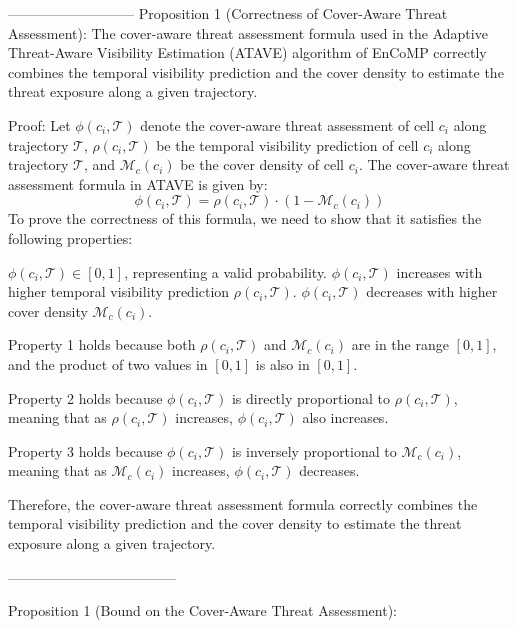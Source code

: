 ---------------------------
Proposition 1 (Correctness of Cover-Aware Threat Assessment):
The cover-aware threat assessment formula used in the Adaptive Threat-Aware Visibility Estimation (ATAVE) algorithm of EnCoMP correctly combines the temporal visibility prediction and the cover density to estimate the threat exposure along a given trajectory.

Proof:
Let $\phi(c_i, \mathcal{T})$ denote the cover-aware threat assessment of cell $c_i$ along trajectory $\mathcal{T}$, $\rho(c_i, \mathcal{T})$ be the temporal visibility prediction of cell $c_i$ along trajectory $\mathcal{T}$, and $\mathcal{M}_c(c_i)$ be the cover density of cell $c_i$.
The cover-aware threat assessment formula in ATAVE is given by:
\begin{equation}
\phi(c_i, \mathcal{T}) = \rho(c_i, \mathcal{T}) \cdot (1 - \mathcal{M}_c(c_i))
\end{equation}
To prove the correctness of this formula, we need to show that it satisfies the following properties:

$\phi(c_i, \mathcal{T}) \in [0, 1]$, representing a valid probability.
$\phi(c_i, \mathcal{T})$ increases with higher temporal visibility prediction $\rho(c_i, \mathcal{T})$.
$\phi(c_i, \mathcal{T})$ decreases with higher cover density $\mathcal{M}_c(c_i)$.

Property 1 holds because both $\rho(c_i, \mathcal{T})$ and $\mathcal{M}_c(c_i)$ are in the range $[0, 1]$, and the product of two values in $[0, 1]$ is also in $[0, 1]$.

Property 2 holds because $\phi(c_i, \mathcal{T})$ is directly proportional to $\rho(c_i, \mathcal{T})$, meaning that as $\rho(c_i, \mathcal{T})$ increases, $\phi(c_i, \mathcal{T})$ also increases.

Property 3 holds because $\phi(c_i, \mathcal{T})$ is inversely proportional to $\mathcal{M}_c(c_i)$, meaning that as $\mathcal{M}_c(c_i)$ increases, $\phi(c_i, \mathcal{T})$ decreases.

Therefore, the cover-aware threat assessment formula correctly combines the temporal visibility prediction and the cover density to estimate the threat exposure along a given trajectory.


------------------------------------


Proposition 1 (Bound on the Cover-Aware Threat Assessment):

